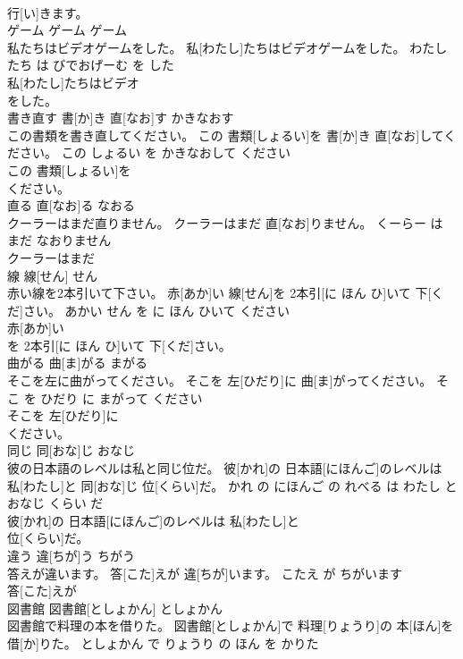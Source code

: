 \documentclass[8pt]{extreport}
\begin{document}
\begin{CJK}{UTF8}{min}
\\	行[い]きます。			
\\	ゲーム	ゲーム	ゲーム	
\\	私たちはビデオゲームをした。	私[わたし]たちはビデオゲームをした。	わたしたち は びでおげーむ を した	
\\	私[わたし]たちはビデオ
\\	をした。			
\\	書き直す	書[か]き 直[なお]す	かきなおす	
\\	この書類を書き直してください。	この 書類[しょるい]を 書[か]き 直[なお]してください。	この しょるい を かきなおして ください	
\\	この 書類[しょるい]を
\\	ください。			
\\	直る	直[なお]る	なおる	
\\	クーラーはまだ直りません。	クーラーはまだ 直[なお]りません。	くーらー は まだ なおりません	
\\	クーラーはまだ
\\	線	線[せん]	せん	
\\	赤い線を2本引いて下さい。	赤[あか]い 線[せん]を 2本引[に ほん ひ]いて 下[くだ]さい。	あかい せん を に ほん ひいて ください	
\\	赤[あか]い
\\	を 2本引[に ほん ひ]いて 下[くだ]さい。			
\\	曲がる	曲[ま]がる	まがる	
\\	そこを左に曲がってください。	そこを 左[ひだり]に 曲[ま]がってください。	そこ を ひだり に まがって ください	
\\	そこを 左[ひだり]に
\\	ください。			
\\	同じ	同[おな]じ	おなじ	
\\	彼の日本語のレベルは私と同じ位だ。	彼[かれ]の 日本語[にほんご]のレベルは 私[わたし]と 同[おな]じ 位[くらい]だ。	かれ の にほんご の れべる は わたし と おなじ くらい だ	
\\	彼[かれ]の 日本語[にほんご]のレベルは 私[わたし]と
\\	位[くらい]だ。			
\\	違う	違[ちが]う	ちがう	
\\	答えが違います。	答[こた]えが 違[ちが]います。	こたえ が ちがいます	
\\	答[こた]えが
\\	図書館	図書館[としょかん]	としょかん	
\\	図書館で料理の本を借りた。	図書館[としょかん]で 料理[りょうり]の 本[ほん]を 借[か]りた。	としょかん で りょうり の ほん を かりた	

\end{CJK}
\end{document}
